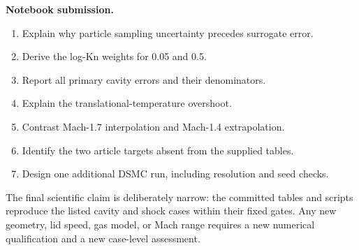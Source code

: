 \documentclass[11pt]{article}
\newcommand{\Kn}{\mathrm{Kn}}
\begin{document}
\begin{learningbox}
\textbf{Notebook submission.}
\begin{enumerate}
\item Explain why particle sampling uncertainty precedes surrogate error.
\item Derive the log-$\Kn$ weights for 0.05 and 0.5.
\item Report all primary cavity errors and their denominators.
\item Explain the translational-temperature overshoot.
\item Contrast Mach-1.7 interpolation and Mach-1.4 extrapolation.
\item Identify the two article targets absent from the supplied tables.
\item Design one additional DSMC run, including resolution and seed checks.
\end{enumerate}
\end{learningbox}

\begin{decisionbox}
The final scientific claim is deliberately narrow: the committed tables and
scripts reproduce the listed cavity and shock cases within their fixed gates.
Any new geometry, lid speed, gas model, or Mach range requires a new numerical
qualification and a new case-level assessment.
\end{decisionbox}
\end{document}
